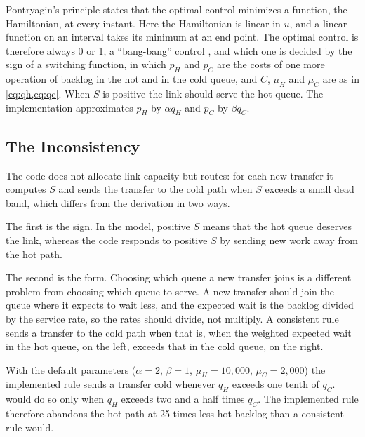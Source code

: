 Pontryagin's principle \citep{pontryagin2018,liberzon2012} states that the optimal control minimizes a function, the Hamiltonian, at every instant. Here the
Hamiltonian is linear in $u$, and a linear function on an interval takes its
minimum at an end point. The optimal control is therefore always 0 or 1, a
``bang-bang'' control \citep{bellman1956}, and which one is decided by the
sign of a switching function,
in which $p_H$ and $p_C$ are the costs of one more operation of backlog in
the hot and in the cold queue, and $C$, $\mu_H$ and $\mu_C$ are as in
\cref{eq:qh,eq:qc}. When $S$ is positive the link should serve the hot
queue. The implementation approximates $p_H$ by $\alpha q_H$ and $p_C$ by
$\beta q_C$.

\subsection{The Inconsistency}

The code does not allocate link capacity but routes: for each new transfer it
computes $S$ and sends the transfer to the cold path when $S$ exceeds a small
dead band, which differs from the derivation in two ways.

The first is the sign. In the model, positive $S$ means that the hot queue
deserves the link, whereas the code responds to positive $S$ by sending new
work away from the hot path.

The second is the form. Choosing which queue a new transfer joins is a
different problem from choosing which queue to serve. A new transfer should
join the queue where it expects to wait less, and the expected wait is the
backlog divided by the service rate, so the rates should divide, not
multiply. A consistent rule sends a transfer to the cold path when
that is, when the weighted expected wait in the hot queue, on the left,
exceeds that in the cold queue, on the right.

With the default parameters ($\alpha = 2$, $\beta = 1$, $\mu_H = 10{,}000$,
$\mu_C = 2{,}000$) the implemented rule sends a transfer cold whenever $q_H$
exceeds one tenth of $q_C$.  would do so only when $q_H$
exceeds two and a half times $q_C$. The implemented rule therefore abandons
the hot path at 25 times less hot backlog than a consistent rule would.


